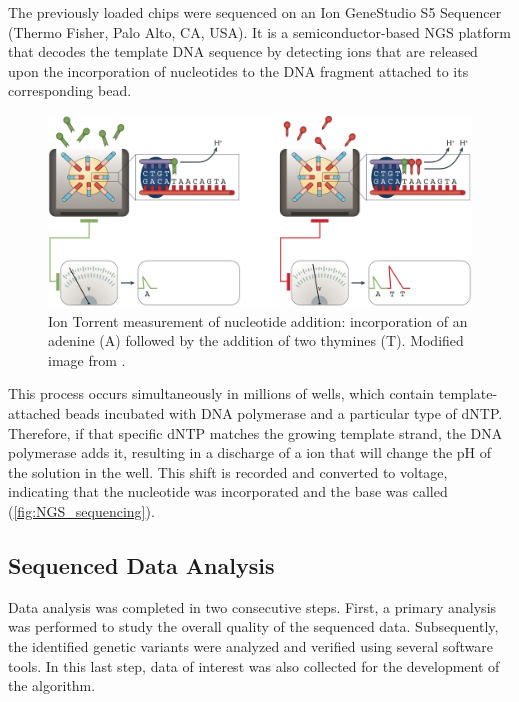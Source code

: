The previously loaded chips were sequenced on an Ion GeneStudio\texttrademark{} S5 Sequencer (Thermo Fisher, Palo Alto, CA, USA). It is a semiconductor-based NGS platform that decodes the template DNA sequence by detecting  ions that are released upon the incorporation of nucleotides to the DNA fragment attached to its corresponding bead. 

\begin{figure}[ht]
    \centering
    \includegraphics[width=\textwidth]{Images/chapter_3/NGS_sequencing.png}
    \caption{Ion Torrent\texttrademark{} measurement of nucleotide addition: incorporation of an adenine (A) followed by the addition of two thymines (T). Modified image from \cite{NGS}.}
    \label{fig:NGS_sequencing}
\end{figure}

This process occurs simultaneously in millions of wells, which contain template-attached beads incubated with DNA polymerase and a particular type of dNTP. Therefore, if that specific dNTP matches the growing template strand, the DNA polymerase adds it, resulting in a discharge of a  ion that will change the pH of the solution in the well. This shift is recorded and converted to voltage, indicating that the nucleotide was incorporated and the base was called (\autoref{fig:NGS_sequencing}).

\subsection{Sequenced Data Analysis}

Data analysis was completed in two consecutive steps. First, a primary analysis was performed to study the overall quality of the sequenced data. Subsequently, the identified genetic variants were analyzed and verified using several software tools. In this last step, data of interest was also collected for the development of the algorithm.

